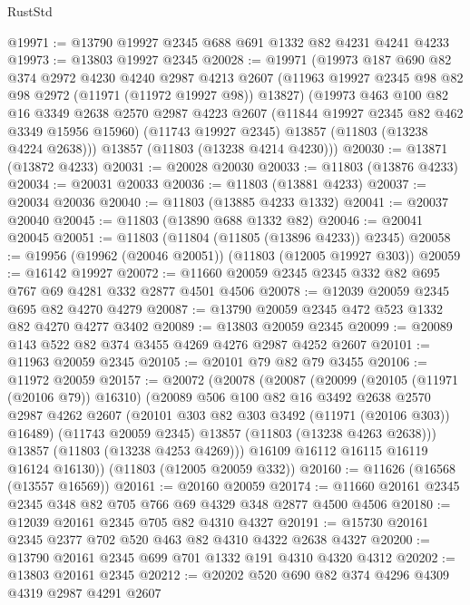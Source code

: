 \begin{lexlean}{RustStd}
\begin{coremodule}
@19971 := @13790 @19927 @2345 @688 @691 @1332 @82 @4231 @4241 @4233
@19973 := @13803 @19927 @2345
@20028 := @19971
    (@19973
      @187
      @690
      @82
      @374
      @2972
      @4230
      @4240
      @2987
      @4213
      @2607
      (@11963 @19927 @2345 @98 @82 @98 @2972 (@11971 (@11972 @19927 @98)) @13827)
      (@19973
        @463
        @100
        @82
        @16
        @3349
        @2638
        @2570
        @2987
        @4223
        @2607
        (@11844 @19927 @2345 @82 @462 @3349 @15956 @15960)
        (@11743 @19927 @2345)
        @13857
        (@11803 (@13238 @4224 @2638)))
      @13857
      (@11803 (@13238 @4214 @4230)))
@20030 := @13871 (@13872 @4233)
@20031 := @20028 @20030
@20033 := @11803 (@13876 @4233)
@20034 := @20031 @20033
@20036 := @11803 (@13881 @4233)
@20037 := @20034 @20036
@20040 := @11803 (@13885 @4233 @1332)
@20041 := @20037 @20040
@20045 := @11803 (@13890 @688 @1332 @82)
@20046 := @20041 @20045
@20051 := @11803 (@11804 (@11805 (@13896 @4233)) @2345)
@20058 := @19956 (@19962 (@20046 @20051)) (@11803 (@12005 @19927 @303))
@20059 := @16142 @19927
@20072 := @11660 @20059 @2345 @2345 @332 @82 @695 @767 @69 @4281 @332 @2877 @4501 @4506
@20078 := @12039 @20059 @2345 @695 @82 @4270 @4279
@20087 := @13790 @20059 @2345 @472 @523 @1332 @82 @4270 @4277 @3402
@20089 := @13803 @20059 @2345
@20099 := @20089 @143 @522 @82 @374 @3455 @4269 @4276 @2987 @4252 @2607
@20101 := @11963 @20059 @2345
@20105 := @20101 @79 @82 @79 @3455
@20106 := @11972 @20059
@20157 := @20072
    (@20078
      (@20087
        (@20099
          (@20105 (@11971 (@20106 @79)) @16310)
          (@20089
            @506
            @100
            @82
            @16
            @3492
            @2638
            @2570
            @2987
            @4262
            @2607
            (@20101 @303 @82 @303 @3492 (@11971 (@20106 @303)) @16489)
            (@11743 @20059 @2345)
            @13857
            (@11803 (@13238 @4263 @2638)))
          @13857
          (@11803 (@13238 @4253 @4269)))
        @16109
        @16112
        @16115
        @16119
        @16124
        @16130))
    (@11803 (@12005 @20059 @332))
@20160 := @11626 (@16568 (@13557 @16569))
@20161 := @20160 @20059
@20174 := @11660 @20161 @2345 @2345 @348 @82 @705 @766 @69 @4329 @348 @2877 @4500 @4506
@20180 := @12039 @20161 @2345 @705 @82 @4310 @4327
@20191 := @15730 @20161 @2345 @2377 @702 @520 @463 @82 @4310 @4322 @2638 @4327
@20200 := @13790 @20161 @2345 @699 @701 @1332 @191 @4310 @4320 @4312
@20202 := @13803 @20161 @2345
@20212 := @20202 @520 @690 @82 @374 @4296 @4309 @4319 @2987 @4291 @2607

\end{coremodule}
\end{lexlean}

